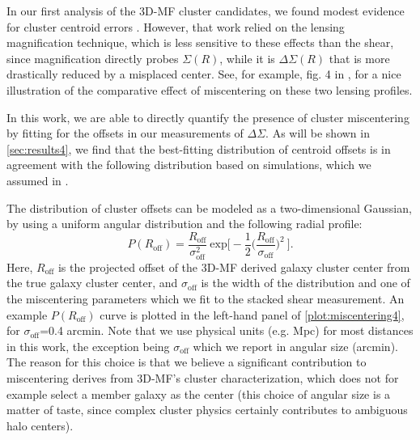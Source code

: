In our first analysis of the \ac{3D-MF} cluster candidates, we found modest evidence for cluster centroid errors \citep{Ford14}. However, that work relied on the lensing magnification technique, which is less sensitive to these effects than the shear, since magnification directly probes $\Sigma(R)$, while it is $\Delta\Sigma(R)$ that is more drastically reduced by a misplaced center. See, for example, fig. 4 in \citet{Johnston07}, for a nice illustration of the comparative effect of miscentering on these two lensing profiles. 

In this work, we are able to directly quantify the presence of cluster miscentering by fitting for the offsets in our measurements of $\Delta\Sigma$. As will be shown in \autoref{sec:results4}, we find that the best-fitting distribution of centroid offsets is in agreement with the following distribution based on simulations, which we assumed in \citet{Ford14}. 

The distribution of cluster offsets can be modeled as a two-dimensional Gaussian, by using a uniform angular distribution and the following radial profile:
\begin{equation}
P(R_{\mathrm{off}})=\frac{R_{\mathrm{off}}}{\sigma_{\mathrm{off}}^2}\ \mathrm{exp}\bigg[-\frac{1}{2}\bigg(\frac{R_{\mathrm{off}}}{\sigma_{\mathrm{off}}}\bigg)^2\ \bigg].
\end{equation}
Here, $R_{\mathrm{off}}$ is the projected offset of the \ac{3D-MF} derived galaxy cluster center from the true galaxy cluster center, and $\sigma_{\mathrm{off}}$ is the width of the distribution and one of the miscentering parameters which we fit to the stacked shear measurement. An example $P(R_{\mathrm{off}})$ curve is plotted in the left-hand panel of \autoref{plot:miscentering4}, for $\sigma_{\mathrm{off}}$=0.4 arcmin. Note that we use physical units (e.g. Mpc) for most distances in this work, the exception being $\sigma_{\mathrm{off}}$ which we report in angular size (arcmin). The reason for this choice is that we believe a significant contribution to miscentering derives from \ac{3D-MF}'s cluster characterization, which does not for example select a member galaxy as the center (this choice of angular size is a matter of taste, since complex cluster physics certainly contributes to ambiguous halo centers). 

